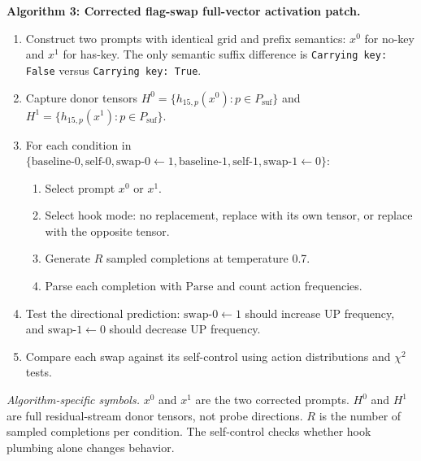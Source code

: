 \documentclass[11pt]{article}
\begin{document}
\medskip
\noindent\textbf{Algorithm 3: Corrected flag-swap full-vector activation patch.}
\begin{enumerate}[leftmargin=*,itemsep=1pt,topsep=2pt]
  \item Construct two prompts with identical grid and prefix semantics:
    $x^0$ for no-key and $x^1$ for has-key.
    The only semantic suffix difference is \texttt{Carrying key: False} versus \texttt{Carrying key: True}.
  \item Capture donor tensors $H^0=\{h_{15,p}(x^0):p\in P_{\mathrm{suf}}\}$ and $H^1=\{h_{15,p}(x^1):p\in P_{\mathrm{suf}}\}$.
  \item For each condition in $\{\mathrm{baseline}\text{-}0,\mathrm{self}\text{-}0,\mathrm{swap}\text{-}0{\leftarrow}1,\mathrm{baseline}\text{-}1,\mathrm{self}\text{-}1,\mathrm{swap}\text{-}1{\leftarrow}0\}$:
    \begin{enumerate}[leftmargin=1.5em,itemsep=1pt,topsep=1pt]
      \item Select prompt $x^0$ or $x^1$.
      \item Select hook mode: no replacement, replace with its own tensor, or replace with the opposite tensor.
      \item Generate $R$ sampled completions at temperature 0.7.
      \item Parse each completion with $\mathrm{Parse}$ and count action frequencies.
    \end{enumerate}
  \item Test the directional prediction: $\mathrm{swap}\text{-}0{\leftarrow}1$ should increase UP frequency, and $\mathrm{swap}\text{-}1{\leftarrow}0$ should decrease UP frequency.
  \item Compare each swap against its self-control using action distributions and $\chi^2$ tests.
\end{enumerate}
\noindent\emph{Algorithm-specific symbols.}
$x^0$ and $x^1$ are the two corrected prompts.
$H^0$ and $H^1$ are full residual-stream donor tensors, not probe directions.
$R$ is the number of sampled completions per condition.
The self-control checks whether hook plumbing alone changes behavior.
\end{document}
